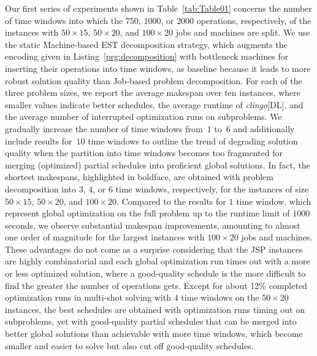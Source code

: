 \documentclass{tlp} %
\newcommand{\clingodl}{\emph{clingo}[DL]\xspace}
\begin{document}
%
Our first series of experiments shown in Table~\ref{tab:Table01} concerns the number
of time windows into which the $750$, $1000$, or $2000$ operations, respectively,
of the instances with $50\times15$, $50\times20$, and $100\times20$ jobs and machines
are split.
We use the static Machine-based EST decomposition strategy, which augments the encoding
given in Listing~\ref{prg:decomposition} with bottleneck machines for inserting 
their operations into time windows, as baseline because it leads to more robust
solution quality than Job-based problem decomposition.
For each of the three problem sizes,
we report the average makespan over ten instances,
where smaller values indicate better schedules,
the average runtime of \clingodl, and the
average number of interrupted optimization runs on subproblems.
We gradually increase the number of time windows from~$1$ to~$6$ and additionally
include results for~$10$ time windows to outline the trend of degrading
solution quality when the partition into time windows becomes too fragmented
for merging (optimized) partial schedules into proficient global solutions.
In fact, the shortest makespans, highlighted in boldface,
are obtained with problem decomposition into
$3$, $4$, or $6$ time windows, respectively, for the instances of size 
$50\times15$, $50\times20$, and $100\times20$.
Compared to the results for $1$ time window,
which represent global optimization on the full problem up to the
runtime limit of $1000$ seconds,
we observe substantial makespan improvements, amounting to almost one order
of magnitude for the largest instances with $100\times20$ jobs and machines.
These advantages do not come as a surprise considering that the JSP instances
are highly combinatorial \citep{shysha18a} and each global optimization run
times out with a more or less optimized solution, 
where a good-quality schedule is the more difficult to find the greater the
number of operations gets.
Except for about 12\% completed optimization runs in multi-shot solving with
$4$ time windows on the $50\times20$ instances,
the best schedules are obtained with optimization runs timing out on subproblems,
yet with good-quality partial schedules that can be merged into better global
solutions than achievable with more time windows, which
become smaller and easier to solve but also cut off good-quality
schedules.
\end{document}
